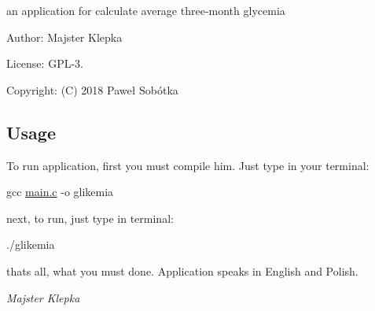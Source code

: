 an application for calculate average three-\/month glycemia

Author\+: Majster Klepka

License\+: G\+P\+L-\/3.

Copyright\+: (C) 2018 Paweł Sobótka

\subsection*{Usage}

To run application, first you must compile him. Just type in your terminal\+:

{\ttfamily gcc \hyperlink{main_8c}{main.\+c} -\/o glikemia}

next, to run, just type in terminal\+:

{\ttfamily ./glikemia}

thats all, what you must done. Application speaks in English and Polish.

{\itshape Majster Klepka} 